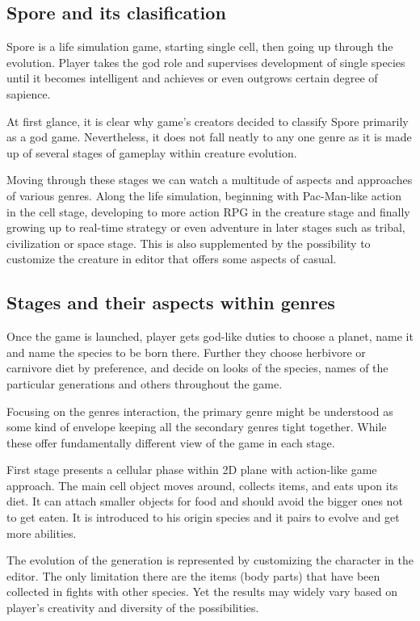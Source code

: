 \documentclass[a4paper,10pt,english]{article}
\begin{document}
\subsection*{Spore and its clasification}

Spore is a life simulation game, starting single cell, then going up through the evolution. Player takes the god role and supervises development of single species until it becomes intelligent and achieves or even outgrows certain degree of sapience.

At first glance, it is clear why game's creators decided to classify Spore primarily as a god game. Nevertheless, it does not fall neatly to any one genre as it is made up of several stages of gameplay within creature evolution.

Moving through these stages we can watch a multitude of aspects and approaches of various genres. Along the life simulation, beginning with Pac-Man-like action in the cell stage, developing to more action RPG in the creature stage and finally growing up to real-time strategy or even adventure in later stages such as tribal, civilization or space stage. This is also supplemented by the possibility to customize the creature in editor that offers some aspects of casual.

\subsection*{Stages and their aspects within genres}
Once the game is launched, player gets god-like duties to choose a planet, name it and name the species to be born there. Further they choose herbivore or carnivore diet by preference, and decide on looks of the species, names of the particular generations and others throughout the game.

Focusing on the genres interaction, the primary genre might be understood as some kind of envelope keeping all the secondary genres tight together. While these offer fundamentally different view of the game in each stage.

First stage presents a cellular phase within 2D plane with action-like game approach. The main cell object moves around, collects items, and  eats upon its diet. It can attach smaller objects for food and should avoid the bigger ones not to get eaten. It is introduced to his origin species and it pairs to evolve and get more abilities. 

The evolution of the generation is represented by customizing the character in the editor. The only limitation there are the items (body parts) that have been collected in fights with other species. Yet the results may widely vary based on player's creativity and diversity of the possibilities.
\end{document}
